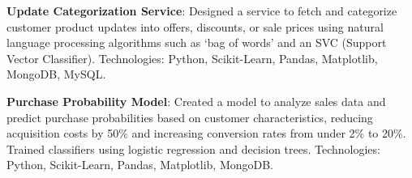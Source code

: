 \begin{cventries}
{\begin{cvitems}
        \item{\textbf{Update Categorization Service}: Designed a service to fetch and categorize customer product updates into offers, discounts, or sale prices using natural language processing algorithms such as ‘bag of words’ and an SVC (Support Vector Classifier). Technologies: Python, Scikit-Learn, Pandas, Matplotlib, MongoDB, MySQL.}
        \item{\textbf{Purchase Probability Model}: Created a model to analyze sales data and predict purchase probabilities based on customer characteristics, reducing acquisition costs by 50\% and increasing conversion rates from under 2\% to 20\%. Trained classifiers using logistic regression and decision trees. Technologies: Python, Scikit-Learn, Pandas, Matplotlib, MongoDB.}
      \end{cvitems}
    }

\end{cventries}